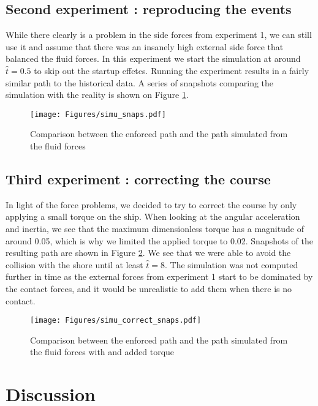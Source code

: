 \documentclass[a4paper]{article}
\begin{document}
\subsection{Second experiment : reproducing the events}
While there clearly is a problem in the side forces from experiment 1, we can still use it and assume that there was an insanely high external side force that balanced the fluid forces. In this experiment we start the simulation at around $\hat{t} = 0.5$ to skip out the startup effetcs. Running the experiment results in a fairly similar path to the historical data. A series of snapshots comparing the simulation with the reality is shown on Figure \ref{fig:simu_snaps}.
\begin{figure}[hbtb]
	\centering
	\texttt{[image: Figures/simu\_snaps.pdf]}
	\caption{Comparison between the enforced path and the path simulated from the fluid forces}
	\label{fig:simu_snaps}
\end{figure}


\subsection{Third experiment : correcting the course}
In light of the force problems, we decided to try to correct the course by only applying a small torque on the ship. When looking at the angular acceleration and inertia, we see that the maximum dimensionless torque has a magnitude of around 0.05, which is why we limited the applied torque to 0.02. Snapshots of the resulting path are shown in Figure \ref{fig:simu_correct_snaps}. We see that we were able to avoid the collision with the shore until at least $\hat{t} = 8$. The simulation was not computed further in time as the external forces from experiment 1 start to be dominated by the contact forces, and it would be unrealistic to add them when there is no contact.

\begin{figure}[hbtb]
	\centering
	\texttt{[image: Figures/simu\_correct\_snaps.pdf]}
	\caption{Comparison between the enforced path and the path simulated from the fluid forces with and added torque}
	\label{fig:simu_correct_snaps}
\end{figure}


\section{Discussion}
\end{document}
